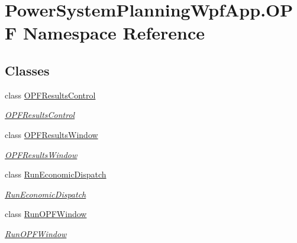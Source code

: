 \hypertarget{namespace_power_system_planning_wpf_app_1_1_o_p_f}{}\section{Power\+System\+Planning\+Wpf\+App.\+O\+PF Namespace Reference}
\label{namespace_power_system_planning_wpf_app_1_1_o_p_f}
\subsection*{Classes}
\begin{DoxyCompactItemize}
\item 
class \hyperlink{class_power_system_planning_wpf_app_1_1_o_p_f_1_1_o_p_f_results_control}{O\+P\+F\+Results\+Control}
\begin{DoxyCompactList}\small\item\em \hyperlink{class_power_system_planning_wpf_app_1_1_o_p_f_1_1_o_p_f_results_control}{O\+P\+F\+Results\+Control} \end{DoxyCompactList}\item 
class \hyperlink{class_power_system_planning_wpf_app_1_1_o_p_f_1_1_o_p_f_results_window}{O\+P\+F\+Results\+Window}
\begin{DoxyCompactList}\small\item\em \hyperlink{class_power_system_planning_wpf_app_1_1_o_p_f_1_1_o_p_f_results_window}{O\+P\+F\+Results\+Window} \end{DoxyCompactList}\item 
class \hyperlink{class_power_system_planning_wpf_app_1_1_o_p_f_1_1_run_economic_dispatch}{Run\+Economic\+Dispatch}
\begin{DoxyCompactList}\small\item\em \hyperlink{class_power_system_planning_wpf_app_1_1_o_p_f_1_1_run_economic_dispatch}{Run\+Economic\+Dispatch} \end{DoxyCompactList}\item 
class \hyperlink{class_power_system_planning_wpf_app_1_1_o_p_f_1_1_run_o_p_f_window}{Run\+O\+P\+F\+Window}
\begin{DoxyCompactList}\small\item\em \hyperlink{class_power_system_planning_wpf_app_1_1_o_p_f_1_1_run_o_p_f_window}{Run\+O\+P\+F\+Window} \end{DoxyCompactList}\end{DoxyCompactItemize}
